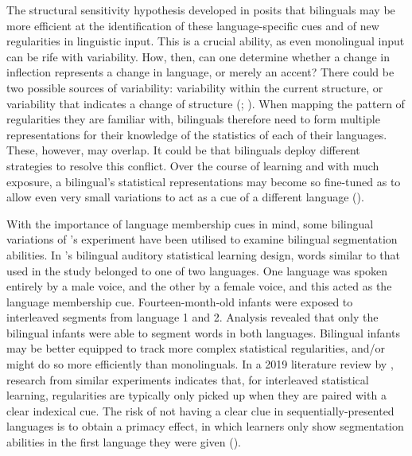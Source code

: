 The structural sensitivity hypothesis developed in \textcite{Kuo2012} posits that bilinguals may be more efficient at the identification of these language-specific cues and of new regularities in linguistic input. This is a crucial ability, as even monolingual input can be rife with variability. How, then, can one determine whether a change in inflection represents a change in language, or merely an accent? There could be two possible sources of variability: variability within the current structure, or variability that indicates a change of structure (\cite{Bulgarelli2016}; \cite{Bulgarelli2018}). When mapping the pattern of regularities they are familiar with, bilinguals therefore need to form multiple representations for their knowledge of the statistics of each of their languages. These, however, may overlap. It could be that bilinguals deploy different strategies to resolve this conflict. Over the course of learning and with much exposure, a bilingual's statistical representations may become so fine-tuned as to allow even very small variations to act as a cue of a different language (\cite{Antovich2020}).

With the importance of language membership cues in mind, some bilingual variations of \textcite{Saffran1996}'s experiment have been utilised to examine bilingual segmentation abilities. In \textcite{Antovich2018}'s bilingual auditory statistical learning design, words similar to that used in the \textcite{Saffran1996} study belonged to one of two languages. One language was spoken entirely by a male voice, and the other by a female voice, and this acted as the language membership cue. Fourteen-month-old infants were exposed to interleaved segments from language 1 and 2. Analysis revealed that only the bilingual infants were able to segment words in both languages. Bilingual infants may be better equipped to track more complex statistical regularities, and/or might do so more efficiently than monolinguals. In a 2019 literature review by \textcite{Weiss2020}, research from similar experiments indicates that, for interleaved statistical learning, regularities are typically only picked up when they are paired with a clear indexical cue. The risk of not having a clear clue in sequentially-presented languages is to obtain a primacy effect, in which learners only show segmentation abilities in the first language they were given (\cite{Bulgarelli2016}).

